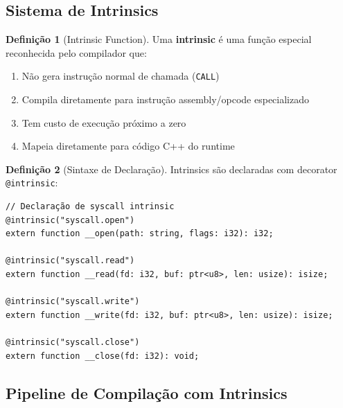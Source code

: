 \documentclass[12pt,a4paper]{article}
\theoremstyle{definition}
\newtheorem{definition}{Definição}[section]
\begin{document}
\subsection{Sistema de Intrinsics}

\begin{definition}[Intrinsic Function]
Uma \textbf{intrinsic} é uma função especial reconhecida pelo compilador que:
\begin{enumerate}
    \item Não gera instrução normal de chamada (\texttt{CALL})
    \item Compila diretamente para instrução assembly/opcode especializado
    \item Tem custo de execução próximo a zero
    \item Mapeia diretamente para código C++ do runtime
\end{enumerate}
\end{definition}

\begin{definition}[Sintaxe de Declaração]
Intrinsics são declaradas com decorator \texttt{@intrinsic}:

\begin{verbatim}
// Declaração de syscall intrinsic
@intrinsic("syscall.open")
extern function __open(path: string, flags: i32): i32;

@intrinsic("syscall.read")
extern function __read(fd: i32, buf: ptr<u8>, len: usize): isize;

@intrinsic("syscall.write")
extern function __write(fd: i32, buf: ptr<u8>, len: usize): isize;

@intrinsic("syscall.close")
extern function __close(fd: i32): void;
\end{verbatim}
\end{definition}

\subsection{Pipeline de Compilação com Intrinsics}
\end{document}
